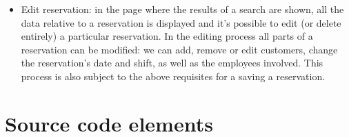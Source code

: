 \documentclass{article}
\begin{document}
\begin{itemize}
   \item Edit reservation: in the page where the results of a search are shown, 
   		all the data relative to a reservation is displayed and it's possible 
   		to edit (or delete entirely) a particular reservation.
   		In the editing process all parts of a reservation can be modified: 
   		we can add, remove or edit customers, change the reservation's date and shift,
   		as well as the employees involved. This process is also subject to the 
   		above requisites for a saving a reservation.
\end{itemize}



\clearpage
\section*{Source code elements}
\end{document}
